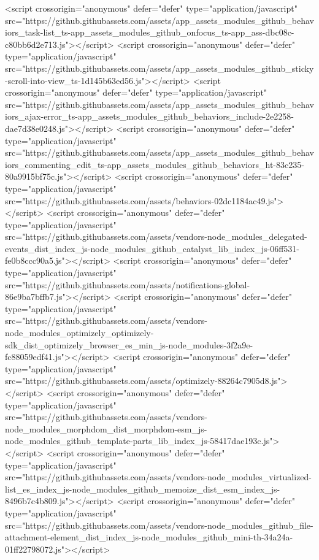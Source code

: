 <script crossorigin="anonymous" defer="defer" type="application/javascript" src="https://github.githubassets.com/assets/app_assets_modules_github_behaviors_task-list_ts-app_assets_modules_github_onfocus_ts-app_ass-dbc08c-c80bb6d2e713.js"></script>
<script crossorigin="anonymous" defer="defer" type="application/javascript" src="https://github.githubassets.com/assets/app_assets_modules_github_sticky-scroll-into-view_ts-1d145b63ed56.js"></script>
<script crossorigin="anonymous" defer="defer" type="application/javascript" src="https://github.githubassets.com/assets/app_assets_modules_github_behaviors_ajax-error_ts-app_assets_modules_github_behaviors_include-2e2258-dae7d38e0248.js"></script>
<script crossorigin="anonymous" defer="defer" type="application/javascript" src="https://github.githubassets.com/assets/app_assets_modules_github_behaviors_commenting_edit_ts-app_assets_modules_github_behaviors_ht-83c235-80a9915bf75c.js"></script>
<script crossorigin="anonymous" defer="defer" type="application/javascript" src="https://github.githubassets.com/assets/behaviors-02dc1184ac49.js"></script>
<script crossorigin="anonymous" defer="defer" type="application/javascript" src="https://github.githubassets.com/assets/vendors-node_modules_delegated-events_dist_index_js-node_modules_github_catalyst_lib_index_js-06ff531-fe0b8ccc90a5.js"></script>
<script crossorigin="anonymous" defer="defer" type="application/javascript" src="https://github.githubassets.com/assets/notifications-global-86e9ba7bffb7.js"></script>
<script crossorigin="anonymous" defer="defer" type="application/javascript" src="https://github.githubassets.com/assets/vendors-node_modules_optimizely_optimizely-sdk_dist_optimizely_browser_es_min_js-node_modules-3f2a9e-fc88059edf41.js"></script>
<script crossorigin="anonymous" defer="defer" type="application/javascript" src="https://github.githubassets.com/assets/optimizely-88264c7905d8.js"></script>
<script crossorigin="anonymous" defer="defer" type="application/javascript" src="https://github.githubassets.com/assets/vendors-node_modules_morphdom_dist_morphdom-esm_js-node_modules_github_template-parts_lib_index_js-58417dae193c.js"></script>
<script crossorigin="anonymous" defer="defer" type="application/javascript" src="https://github.githubassets.com/assets/vendors-node_modules_virtualized-list_es_index_js-node_modules_github_memoize_dist_esm_index_js-8496b7c4b809.js"></script>
<script crossorigin="anonymous" defer="defer" type="application/javascript" src="https://github.githubassets.com/assets/vendors-node_modules_github_file-attachment-element_dist_index_js-node_modules_github_mini-th-34a24a-01ff22798072.js"></script>
